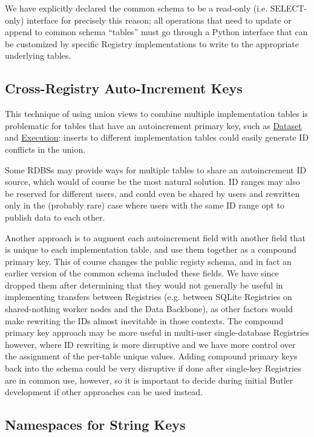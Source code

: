 \documentclass[DM,toc]{lsstdoc}
\newcommand{\tblref}[1]{\hyperref[tbl:#1]{#1}}
\begin{document}
We have explicitly declared the common schema to be a read-only (i.e. SELECT-only) interface for precisely this reason; all operations that need to update or append to common schema ``tables'' must go through a Python interface that can be customized by specific Registry implementations to write to the appropriate underlying tables.

\subsection{Cross-Registry Auto-Increment Keys}
\label{sec:cross-registry-auto-increment-keys}

This technique of using union views to combine multiple implementation tables is problematic for tables that have an autoincrement primary key, such as \tblref{Dataset} and \tblref{Execution}: inserts to different implementation tables could easily generate ID conflicts in the union.

Some RDBSs may provide ways for multiple tables to share an autoincrement ID source, which would of course be the most natural solution.
ID ranges may also be reserved for different users, and could even be shared by users and rewritten only in the (probably rare) case where users with the same ID range opt to publish data to each other.

Another approach is to augment each autoincrement field with another field that is unique to each implementation table, and use them together as a compound primary key.
This of course changes the public registy schema, and in fact an earlier version of the common schema included these fields.
We have since dropped them after determining that they would not generally be useful in implementing transfers between Registries (e.g. between SQLite Registries on shared-nothing worker nodes and the Data Backbone), as other factors would make rewriting the IDs almost inevitable in those contexts.
The compound primary key approach may be more useful in multi-user single-database Registries however, where ID rewriting is more disruptive and we have more control over the assignment of the per-table unique values.
Adding compound primary keys back into the schema could be very disruptive if done after single-key Registries are in common use, however, so it is important to decide during initial Butler development if other approaches can be used instead.

\subsection{Namespaces for String Keys}
\label{sec:namespaces-for-string-keys}
\end{document}
